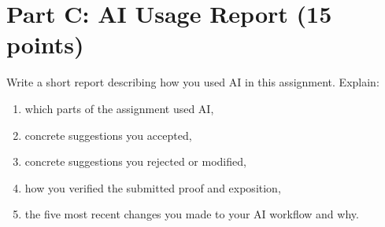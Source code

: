 \documentclass{article}
\begin{document}
\section{Part C: AI Usage Report (15 points)}

Write a short report describing how you used AI in this assignment. Explain:
\begin{enumerate}
\item which parts of the assignment used AI,
\item concrete suggestions you accepted,
\item concrete suggestions you rejected or modified,
\item how you verified the submitted proof and exposition,
\item the five most recent changes you made to your AI workflow and why.
\end{enumerate}
\end{document}
